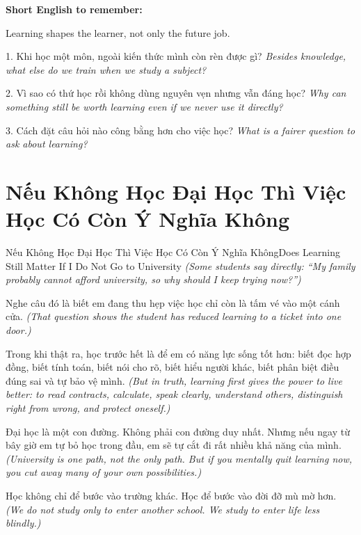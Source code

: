 \begin{ghinhoanh}
\textbf{Short English to remember:}

Learning shapes the learner, not only the future job.

\end{ghinhoanh}

\begin{tuhocnhanh}
1. Khi học một môn, ngoài kiến thức mình còn rèn được gì? \textit{Besides knowledge, what else do we train when we study a subject?}

2. Vì sao có thứ học rồi không dùng nguyên vẹn nhưng vẫn đáng học? \textit{Why can something still be worth learning even if we never use it directly?}

3. Cách đặt câu hỏi nào công bằng hơn cho việc học? \textit{What is a fairer question to ask about learning?}
\end{tuhocnhanh}
\ngancach

\section{Nếu Không Học Đại Học Thì Việc Học Có Còn Ý Nghĩa Không}
\begin{truyen}{Nếu Không Học Đại Học Thì Việc Học Có Còn Ý Nghĩa Không}{Does Learning Still Matter If I Do Not Go to University}
\textit{(Some students say directly: “My family probably cannot afford university, so why should I keep trying now?”)}

Nghe câu đó là biết em đang thu hẹp việc học chỉ còn là tấm vé vào một cánh cửa.
\textit{(That question shows the student has reduced learning to a ticket into one door.)}

Trong khi thật ra, học trước hết là để em có năng lực sống tốt hơn: biết đọc hợp đồng, biết tính toán, biết nói cho rõ, biết hiểu người khác, biết phân biệt điều đúng sai và tự bảo vệ mình.
\textit{(But in truth, learning first gives the power to live better: to read contracts, calculate, speak clearly, understand others, distinguish right from wrong, and protect oneself.)}

Đại học là một con đường. Không phải con đường duy nhất. Nhưng nếu ngay từ bây giờ em tự bỏ học trong đầu, em sẽ tự cắt đi rất nhiều khả năng của mình.
\textit{(University is one path, not the only path. But if you mentally quit learning now, you cut away many of your own possibilities.)}

Học không chỉ để bước vào trường khác. Học để bước vào đời đỡ mù mờ hơn.
\textit{(We do not study only to enter another school. We study to enter life less blindly.)}
\end{truyen}


